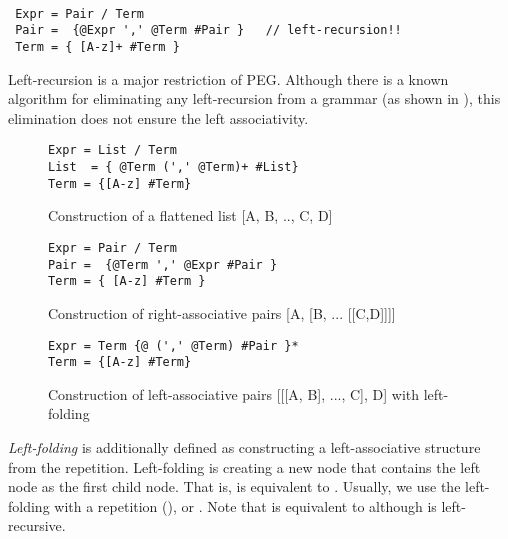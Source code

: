 \documentclass[JIP]{ipsj}
\begin{document}
{\small \begin{verbatim}

 Expr = Pair / Term
 Pair =  {@Expr ',' @Term #Pair }   // left-recursion!!
 Term = { [A-z]+ #Term }

\end{verbatim}}

Left-recursion is a major restriction of PEG. Although there is a known algorithm for eliminating any left-recursion from a grammar (as shown in \cite{OOPSLA14_Antlr}), this elimination does not ensure the left associativity. 

\begin{figure}[tb]
{\small \begin{framed} \begin{verbatim}
Expr = List / Term
List  = { @Term (',' @Term)+ #List}
Term = {[A-z] #Term}
\end{verbatim} \end{framed}}
\caption{Construction of a flattened list [A, B, .., C, D]}
\label{fig:list}
\end{figure}

\begin{figure}[tb]
{\small \begin{framed} \begin{verbatim}
Expr = Pair / Term
Pair =  {@Term ',' @Expr #Pair } 
Term = { [A-z] #Term }
\end{verbatim} \end{framed} }
\caption{Construction of right-associative pairs [A, [B, ... [[C,D]]]]}
\label{fig:right}
\end{figure}

\begin{figure}[tb]
{\small \begin{framed} \begin{verbatim}
Expr = Term {@ (',' @Term) #Pair }*
Term = {[A-z] #Term}
\end{verbatim} \end{framed} }
\caption{Construction of left-associative pairs [[[A, B], ..., C], D] with left-folding}
\label{fig:left}
\end{figure}

{\em Left-folding} is additionally defined as constructing a left-associative structure from the repetition.  Left-folding  is creating a new node that contains the left node as the first child node. That is,  is equivalent to . Usually, we use the left-folding with a repetition (), or  . Note that  is equivalent to   although  is left-recursive. 
\end{document}
